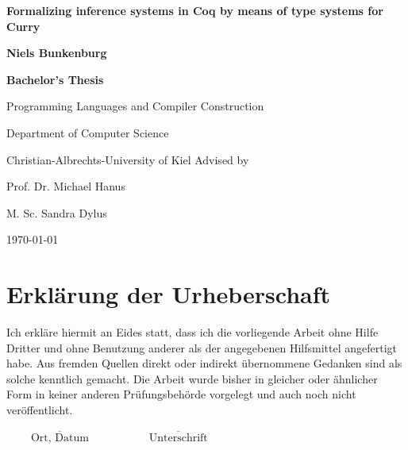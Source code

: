 \documentclass[paper = a4, fleqn, twoside]{scrreprt}
\begin{document}

\begin{titlepage}
	\vspace*{3cm}
	\centering
	{\huge\bfseries Formalizing inference systems in Coq by means of type systems for Curry\par}
	\vspace{1cm}
	\textbf{Niels Bunkenburg} \par 
	\vspace{6cm}
	\textbf{Bachelor's Thesis} \par
	Programming Languages and Compiler Construction \par
	Department of Computer Science \par
	Christian-Albrechts-University of Kiel
	\vfill
	Advised by\par
	Prof. Dr. Michael Hanus \par
	M. Sc. Sandra Dylus
	\vfill
	{\large \today\par}
\end{titlepage}

\chapter*{Erklärung der Urheberschaft}
\vspace{2cm}
Ich erkläre hiermit an Eides statt, dass ich die vorliegende Arbeit
ohne Hilfe Dritter und ohne Benutzung anderer als der angegebenen
Hilfsmittel angefertigt habe. Aus fremden Quellen direkt oder
indirekt übernommene Gedanken sind als solche kenntlich gemacht. Die
Arbeit wurde bisher in gleicher oder ähnlicher Form in keiner anderen
Prüfungsbehörde vorgelegt und auch noch nicht veröffentlicht.

\vspace{4cm}
\hspace{1cm} $\overline{~~~~~~~~~~\mbox{Ort, Datum}~~~~~~~~~~}$ \hfill $\overline{~~~~~~~~~~~~~\mbox{Unterschrift}~~~~~~~~~~~~~}$ \hspace{1cm}

\renewcommand{\contentsname}{Contents}
\tableofcontents   %
\listoffigures     %

\newpage               %
\end{document}
